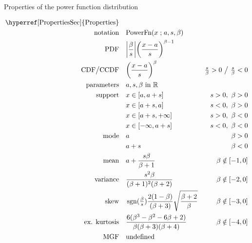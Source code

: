 

\begin{table*}[t!]
\caption[Power function distribution -- Properties]{Properties of the power function distribution}
\begin{align*}
\text{\hyperref[PropertiesSec]{Properties}}  \quad& \\
\text{notation}\quad &   \text{PowerFn}(x\given a,s,\beta) 
\\
\text{PDF}\quad &   \Left|\frac{\beta}{ s}\Right|\Left(\frac{x-a}{s} \Right)^{\beta -1}  \checked
\\
 \text{CDF}  \big/ \text{CCDF} \quad  &   \Left(\frac{x-a}{s} \Right)^{\beta } & \tfrac{s}{\beta}  >0 \ \big{/} \ \tfrac{s}{\beta}<0  \checked
\\
\text{parameters}\quad &   a, s, \beta \text{ in } \Real
\\
\text{support} \quad &    x \in [a,a+s] & s>0,\ \beta >0 \checked
 \\ 			 &  x\in[a+s,a] &s<0,\ \beta >0   \checked
 \\  			 &  x\in[a+s,+\infty]& s>0,\ \beta<0 \checked
 \\  			&  x\in[-\infty,a+s] & s<0,\ \beta<0  \checked
\\
\text{mode} \quad  & a & \beta >0 \checked
\\
& a+s & \beta <0  \checked
\\
\text{mean} \quad  &a+  \frac{s\beta}{\beta+1} &  \beta \notin [-1,0] \checked
\\
\text{variance} \quad  & \frac{ s^2 \beta }{ (\beta+1)^2 (\beta+2) } & \beta \notin [-2,0] \checked
\\
\text{skew} \quad  & \op{sgn}(\tfrac{\beta}{s}) \frac{2(1-\beta)}{(\beta+3)}  \sqrt{\frac{\beta+2}{\beta}}
& \beta \notin [-3,0] 
\checked
\\
\text{ex. kurtosis} \quad  &  \frac{6(\beta^3-\beta ^2- 6 \beta +2)}{\beta(\beta +3)(\beta +4)} & \beta \notin [-4,0] \checked
\\
\text{MGF} \quad  &  \text{undefined}
\end{align*}
\end{table*}
